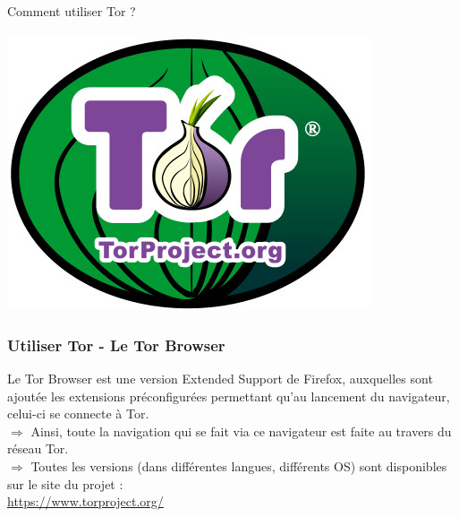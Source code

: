 \documentclass{beamer}
\begin{document}
\begin{frame}
\begin{center}
\Huge{Comment utiliser Tor ? }
\\~\\ \includegraphics[scale=0.4]{./images/logo_tor.jpg}
\end{center}
\end{frame}
\begin{frame}
\frametitle{Utiliser Tor - Le Tor Browser}
Le Tor Browser est une version Extended Support de Firefox, auxquelles sont ajoutée les extensions préconfigurées permettant qu’au lancement du navigateur, celui-ci se connecte à Tor. 
\\$\Rightarrow$ Ainsi, toute la navigation qui se fait via ce navigateur est faite au travers du réseau Tor. 
\\$\Rightarrow$ Toutes les versions (dans différentes langues, différents OS) sont disponibles sur le site du projet : 
\\ \url{https://www.torproject.org/}
\end{frame}
\end{document}
